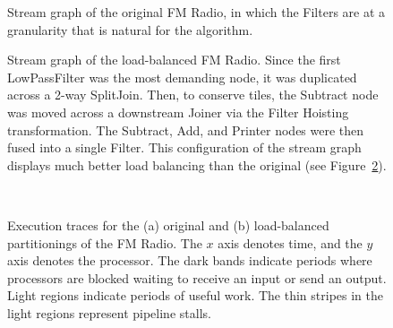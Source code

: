 \begin{figure}
\begin{minipage}{3.2in}
\centering
{}
\parbox{2.75in}{
\caption{\protect\small Stream graph of the original FM Radio, in
which the Filters are at a granularity that is natural for the
algorithm. \protect\label{fig:fm-orig}}}
\end{minipage}
\hspace{0.1in}
\begin{minipage}{3.2in}
\centering
\vspace{1.1in}
\parbox{2.75in}{
\caption{\protect\small Stream graph of the load-balanced FM Radio.
Since the first LowPassFilter was the most demanding node, it was
duplicated across a 2-way SplitJoin.  Then, to conserve tiles, the
Subtract node was moved across a downstream Joiner via the Filter
Hoisting transformation.  The Subtract, Add, and Printer nodes were
then fused into a single Filter.  This configuration of the stream
graph displays much better load balancing than the original (see
Figure~\ref{fig:fm-blood}).  \protect\label{fig:fm-opt}}}
\end{minipage}
\end{figure}

\begin{figure}
  \begin{center}  \\
    \hspace{0.3in}  \vspace{-6pt} \caption{Execution traces for the (a)
    original and (b) load-balanced partitionings of the FM Radio.  The
    $x$ axis denotes time, and the $y$ axis denotes the processor.
    The dark bands indicate periods where processors are blocked
    waiting to receive an input or send an output.  Light regions
    indicate periods of useful work.  The thin stripes in the light
    regions represent pipeline stalls.  \protect\label{fig:fm-blood}}
    \vspace{-6pt}
\end{center}
\end{figure}

